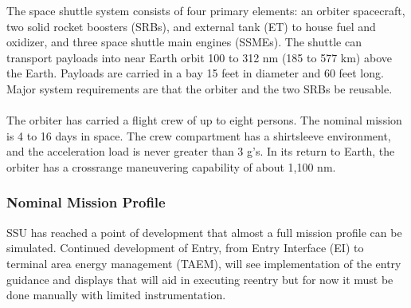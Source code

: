 \documentclass[13pt]{article}
\begin{document}
\begin{multicols}{2}

\noindent
The space shuttle system consists of four primary elements: an orbiter spacecraft, two solid rocket boosters (SRBs), and external tank (ET) to house fuel and oxidizer, and three space shuttle main engines (SSMEs). The shuttle can transport payloads into near Earth orbit 100 to 312 nm (185 to 577 km) above the Earth. Payloads are carried in a bay 15 feet in diameter and 60 feet long. Major system requirements are that the orbiter and the two SRBs be reusable.\\
\\
The orbiter has carried a flight crew of up to eight persons. The nominal mission is 4 to 16 days in space. The crew compartment has a shirtsleeve environment, and the acceleration load is never greater than 3 g's. In its return to Earth, the orbiter has a crossrange maneuvering capability of about 1,100 nm.\\

\subsubsection{\large Nominal Mission Profile}
SSU has reached a point of development that almost a full mission profile can be simulated. Continued development of Entry, from Entry Interface (EI) to terminal area energy management (TAEM), will see implementation of the entry guidance and displays that will aid in executing reentry but for now it must be done manually with limited instrumentation.\\
\\

\end{multicols}
\end{document}
